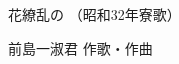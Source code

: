 \documentclass[10pt,b5j]{tarticle} %
\begin{document}
\begin{minipage}[c]{0.7\hsize} %
    \begin{center}
        {\LARGE
            花繚乱の %
        }
        {\small 
            （昭和32年寮歌） %
        }
    \end{center}
\end{minipage}
\begin{minipage}[c]{0.3\hsize} %
    \begin{flushright} %
        前島一淑君 作歌・作曲 %
    \end{flushright}
\end{minipage}
\end{document}
